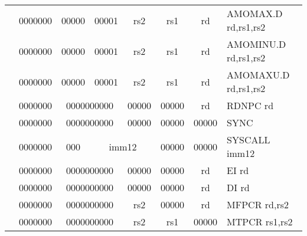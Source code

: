\begin{table}[p]
\begin{small}
\begin{center}
\begin{tabular}{rcccccccccl}
&
\multicolumn{1}{|c|}{0000000} &
\multicolumn{3}{c|}{00000} &
\multicolumn{2}{c|}{00001} &
\multicolumn{1}{c|}{rs2} &
\multicolumn{1}{c|}{rs1} &
\multicolumn{1}{c|}{rd} & AMOMAX.D rd,rs1,rs2 \\
\cline{2-10}
  

&
\multicolumn{1}{|c|}{0000000} &
\multicolumn{3}{c|}{00000} &
\multicolumn{2}{c|}{00001} &
\multicolumn{1}{c|}{rs2} &
\multicolumn{1}{c|}{rs1} &
\multicolumn{1}{c|}{rd} & AMOMINU.D rd,rs1,rs2 \\
\cline{2-10}
  

&
\multicolumn{1}{|c|}{0000000} &
\multicolumn{3}{c|}{00000} &
\multicolumn{2}{c|}{00001} &
\multicolumn{1}{c|}{rs2} &
\multicolumn{1}{c|}{rs1} &
\multicolumn{1}{c|}{rd} & AMOMAXU.D rd,rs1,rs2 \\
\cline{2-10}
  

&
\multicolumn{1}{|c|}{0000000} &
\multicolumn{5}{c|}{0000000000} &
\multicolumn{1}{c|}{00000} &
\multicolumn{1}{c|}{00000} &
\multicolumn{1}{c|}{rd} & RDNPC rd \\
\cline{2-10}
  

&
\multicolumn{1}{|c|}{0000000} &
\multicolumn{5}{c|}{0000000000} &
\multicolumn{1}{c|}{00000} &
\multicolumn{1}{c|}{00000} &
\multicolumn{1}{c|}{00000} & SYNC  \\
\cline{2-10}
  

&
\multicolumn{1}{|c|}{0000000} &
\multicolumn{2}{c|}{000} &
\multicolumn{4}{c|}{imm12} &
\multicolumn{1}{c|}{00000} &
\multicolumn{1}{c|}{00000} & SYSCALL imm12 \\
\cline{2-10}
  

&
\multicolumn{1}{|c|}{0000000} &
\multicolumn{5}{c|}{0000000000} &
\multicolumn{1}{c|}{00000} &
\multicolumn{1}{c|}{00000} &
\multicolumn{1}{c|}{rd} & EI rd \\
\cline{2-10}
  

&
\multicolumn{1}{|c|}{0000000} &
\multicolumn{5}{c|}{0000000000} &
\multicolumn{1}{c|}{00000} &
\multicolumn{1}{c|}{00000} &
\multicolumn{1}{c|}{rd} & DI rd \\
\cline{2-10}
  

&
\multicolumn{1}{|c|}{0000000} &
\multicolumn{5}{c|}{0000000000} &
\multicolumn{1}{c|}{rs2} &
\multicolumn{1}{c|}{00000} &
\multicolumn{1}{c|}{rd} & MFPCR rd,rs2 \\
\cline{2-10}
  

&
\multicolumn{1}{|c|}{0000000} &
\multicolumn{5}{c|}{0000000000} &
\multicolumn{1}{c|}{rs2} &
\multicolumn{1}{c|}{rs1} &
\multicolumn{1}{c|}{00000} & MTPCR rs1,rs2 \\
\cline{2-10}
  


\end{tabular}
\end{center}
\end{small}
\end{table}
